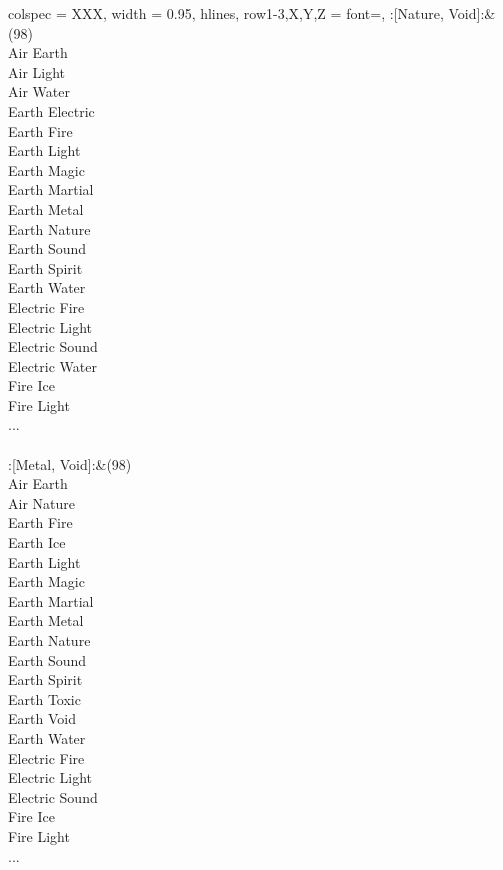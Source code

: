\begin{longtblr}[
	caption = {2v2 Attacking Effective},
	label = {2v2-Attacking-Effective},
]{
	colspec = {XXX}, width = 0.95\linewidth,
	hlines,
	row{1-3,X,Y,Z} = {font=\bfseries},
}
	:[Nature, Void]:&{(98)\\
	Air Earth \\
	Air Light \\
	Air Water \\
	Earth Electric \\
	Earth Fire \\
	Earth Light \\
	Earth Magic \\
	Earth Martial \\
	Earth Metal \\
	Earth Nature \\
	Earth Sound \\
	Earth Spirit \\
	Earth Water \\
	Electric Fire \\
	Electric Light \\
	Electric Sound \\
	Electric Water \\
	Fire Ice \\
	Fire Light \\
	...\\
	}\\

	:[Metal, Void]:&{(98)\\
	Air Earth \\
	Air Nature \\
	Earth Fire \\
	Earth Ice \\
	Earth Light \\
	Earth Magic \\
	Earth Martial \\
	Earth Metal \\
	Earth Nature \\
	Earth Sound \\
	Earth Spirit \\
	Earth Toxic \\
	Earth Void \\
	Earth Water \\
	Electric Fire \\
	Electric Light \\
	Electric Sound \\
	Fire Ice \\
	Fire Light \\
	...\\
	}\\


\end{longtblr}
